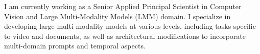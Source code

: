 \par{
I am currently working as a Senior Applied Principal Scientist in Computer Vision and Large Multi-Modality Models (LMM) domain. I specialize in developing large multi-modality models at various levels, including tasks specific to video and documents, as well as architectural modifications to incorporate multi-domain prompts and temporal aspects.
}